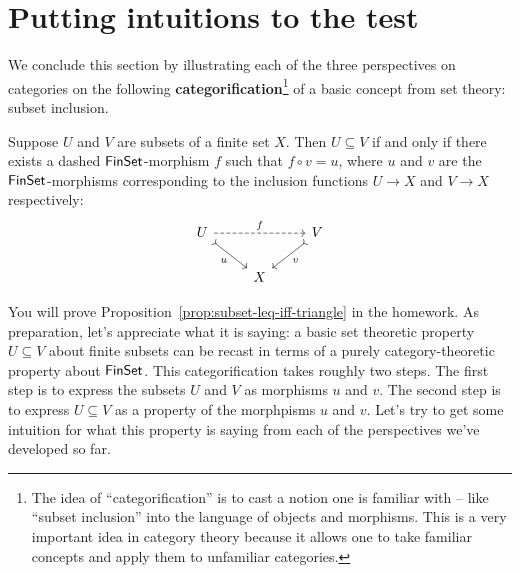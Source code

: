 \section{Putting intuitions to the test}

We conclude this section by illustrating each of the three perspectives
on categories on the following
\textbf{categorification}\footnote{The idea of ``categorification'' is to 
cast a notion one is familiar with -- like ``subset inclusion'' into 
the language of objects and morphisms. This is a very important idea 
in category theory because it allows one to take familiar concepts 
and apply them to unfamiliar categories.} of
a basic concept from set theory: subset inclusion.
\begin{proposition} \label{prop:subset-leq-iff-triangle}
Suppose \(U\) and \(V\) are subsets of a finite set \(X\).
Then \(U \subseteq V\) if and only if
there exists a dashed \(\mathsf{FinSet}\)-morphism \(f\)
such that \(f \circ v = u\),
where \(u\) and \(v\) are the \(\mathsf{FinSet}\)-morphisms
corresponding to the inclusion functions \(U \to X\) and \(V \to X\)
respectively:
\begin{equation}
\begin{tikzcd}
U \arrow[rd, "u"', tail] \arrow[rr, "f", dashed] &   & V \arrow[ld, "v", tail] \\
                                                 & X &
\end{tikzcd}
\end{equation}
\end{proposition}
You will prove Proposition~\ref{prop:subset-leq-iff-triangle} in the homework.
As preparation,
let's appreciate what it is saying: a basic set theoretic
property \(U\subseteq V\) about finite subsets
can be recast in terms of a purely category-theoretic property
about \(\mathsf{FinSet}\).
This categorification takes roughly two steps.
The first step is to express the subsets \(U\) and \(V\)
as morphisms \(u\) and \(v\).
The second step is to express \(U\subseteq V\)
as a property of the morphpisms \(u\) and \(v\).
Let's try to get some intuition for what this property is saying
from each of the perspectives we've developed so far.
